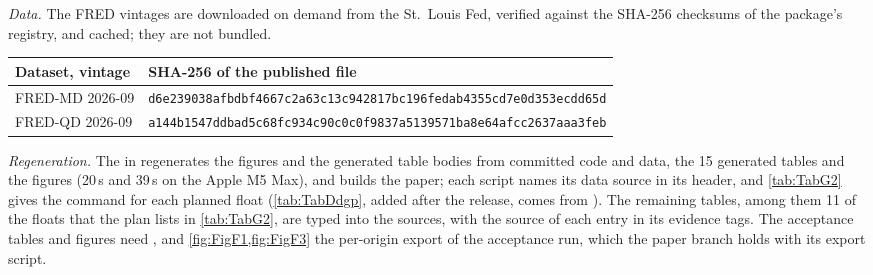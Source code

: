 \emph{Data.}
The FRED vintages are downloaded on demand from the St.\ Louis Fed, verified against the SHA-256
checksums of the package's registry, and cached; they are not bundled.
\begin{center}\footnotesize
\begin{tabular}{@{}ll@{}}
\toprule
Dataset, vintage & SHA-256 of the published file \\
\midrule
FRED-MD 2026-09 & \texttt{d6e239038afbdbf4667c2a63c13c942817bc196fedab4355cd7e0d353ecdd65d} \\
FRED-QD 2026-09 & \texttt{a144b1547ddbad5c68fc934c90c0c0f9837a5139571ba8e64afcc2637aaa3feb} \\
\bottomrule
\end{tabular}
\end{center}

\emph{Regeneration.}
The  in  regenerates the figures and the generated table bodies
from committed code and data,  the 15 generated tables and 
the figures (20\,s and 39\,s on the Apple M5 Max), and  builds the paper; each
script names its data source in its header, and \cref{tab:TabG2} gives the command for each planned float
(\cref{tab:TabDdgp}, added after the release, comes from ).
The remaining tables, among them 11 of the floats that the plan lists in \cref{tab:TabG2}, are typed
into the sources, with the source of each entry in its evidence tags.
The acceptance tables and figures need ,
and \cref{fig:FigF1,fig:FigF3} the per-origin export of the acceptance run, which the paper branch
holds with its export script.

